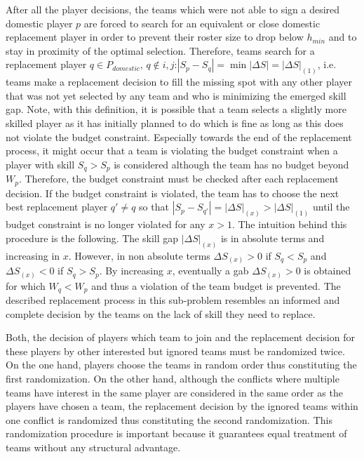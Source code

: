 \documentclass[12pt, a4paper]{article}
\begin{document}
\noindent
After all the player decisions, the teams which were not able to sign a desired domestic player $p$ are forced to search for an equivalent or close domestic replacement player in order to prevent their roster size to drop below $h_{min}$ and to stay in proximity of the optimal selection. Therefore, teams search for a replacement player $q \in P_{domestic}, \, q \notin i,j$:$|S_p-S_q| = \min |\Delta S| = |\Delta S|_{(1)}$, i.e. teams make a replacement decision to fill the missing spot with any other player that was not yet selected by any team and who is minimizing the emerged skill gap. Note, with this definition, it is possible that a team selects a slightly more skilled player as it has initially planned to do which is fine as long as this does not violate the budget constraint. Especially towards the end of the replacement process, it might occur that a team is violating the budget constraint when a player with skill $S_q > S_p$ is considered although the team has no budget beyond $W_p$. Therefore, the budget constraint must be checked after each replacement decision. If the budget constraint is violated, the team has to choose the next best replacement player $q' \neq q$ so that $|S_p-S_{q'}| = |\Delta S|_{(x)} > |\Delta S|_{(1)}$ until the budget constraint is no longer violated for any $x>1$. The intuition behind this procedure is the following. The skill gap $|\Delta S|_{(x)}$ is in absolute terms and increasing in $x$. However, in non absolute terms $\Delta S_{(x)} > 0$ if $S_q < S_p$ and $\Delta S_{(x)} < 0$ if $S_q > S_p$. By increasing $x$, eventually a gab $\Delta S_{(x)} > 0$ is obtained for which $W_q < W_p$ and thus a violation of the team budget is prevented. The described replacement process in this sub-problem resembles an informed and complete decision by the teams on the lack of skill they need to replace.

\par
\noindent
Both, the decision of players which team to join and the replacement decision for these players by other interested but ignored teams must be randomized twice. On the one hand, players choose the teams in random order thus constituting the first randomization. On the other hand, although the conflicts where multiple teams have interest in the same player are considered in the same order as the players have chosen a team, the replacement decision by the ignored teams within one conflict is randomized thus constituting the second randomization. This randomization procedure is important because it guarantees equal treatment of teams without any structural advantage. 
\end{document}
